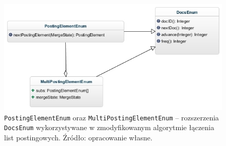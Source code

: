 \begin{figure}[here]
 \includegraphics[scale=0.6]{pictures/PostingEnums.jpg}
 \caption{\texttt{PostingElementEnum} oraz \texttt{MultiPostingElementEnum} -- rozszerzenia \texttt{DocsEnum} wykorzystywane w zmodyfikowanym algorytmie łączenia list postingowych. Źródło: opracowanie własne. \label{fig:postingEnums}}
\end{figure}

